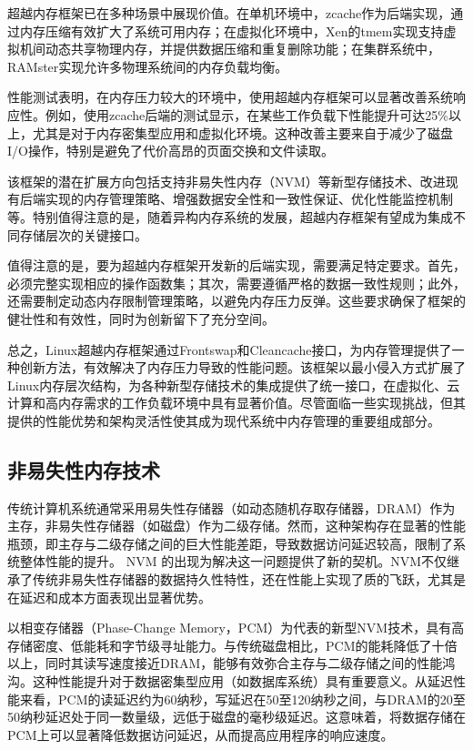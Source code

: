 超越内存框架已在多种场景中展现价值。在单机环境中，zcache作为后端实现，通过内存压缩有效扩大了系统可用内存；在虚拟化环境中，Xen的tmem实现支持虚拟机间动态共享物理内存，并提供数据压缩和重复删除功能；在集群系统中，RAMster实现允许多物理系统间的内存负载均衡。

性能测试表明，在内存压力较大的环境中，使用超越内存框架可以显著改善系统响应性。例如，使用zcache后端的测试显示，在某些工作负载下性能提升可达25\%以上，尤其是对于内存密集型应用和虚拟化环境。这种改善主要来自于减少了磁盘I/O操作，特别是避免了代价高昂的页面交换和文件读取。

该框架的潜在扩展方向包括支持非易失性内存（NVM）等新型存储技术、改进现有后端实现的内存管理策略、增强数据安全性和一致性保证、优化性能监控机制等。特别值得注意的是，随着异构内存系统的发展，超越内存框架有望成为集成不同存储层次的关键接口。

值得注意的是，要为超越内存框架开发新的后端实现，需要满足特定要求。首先，必须完整实现相应的操作函数集；其次，需要遵循严格的数据一致性规则；此外，还需要制定动态内存限制管理策略，以避免内存压力反弹。这些要求确保了框架的健壮性和有效性，同时为创新留下了充分空间。

总之，Linux超越内存框架通过Frontswap和Cleancache接口，为内存管理提供了一种创新方法，有效解决了内存压力导致的性能问题。该框架以最小侵入方式扩展了Linux内存层次结构，为各种新型存储技术的集成提供了统一接口，在虚拟化、云计算和高内存需求的工作负载环境中具有显著价值。尽管面临一些实现挑战，但其提供的性能优势和架构灵活性使其成为现代系统中内存管理的重要组成部分。

\subsection{非易失性内存技术}

传统计算机系统通常采用易失性存储器（如动态随机存取存储器，DRAM）作为主存，非易失性存储器（如磁盘）作为二级存储。然而，这种架构存在显著的性能瓶颈，即主存与二级存储之间的巨大性能差距，导致数据访问延迟较高，限制了系统整体性能的提升。 NVM 的出现为解决这一问题提供了新的契机。NVM不仅继承了传统非易失性存储器的数据持久性特性，还在性能上实现了质的飞跃，尤其是在延迟和成本方面表现出显著优势。

以相变存储器（Phase-Change Memory，PCM）为代表的新型NVM技术，具有高存储密度、低能耗和字节级寻址能力。与传统磁盘相比，PCM的能耗降低了十倍以上，同时其读写速度接近DRAM，能够有效弥合主存与二级存储之间的性能鸿沟。这种性能提升对于数据密集型应用（如数据库系统）具有重要意义。从延迟性能来看，PCM的读延迟约为60纳秒，写延迟在50至120纳秒之间，与DRAM的20至50纳秒延迟处于同一数量级，远低于磁盘的毫秒级延迟。这意味着，将数据存储在PCM上可以显著降低数据访问延迟，从而提高应用程序的响应速度。

